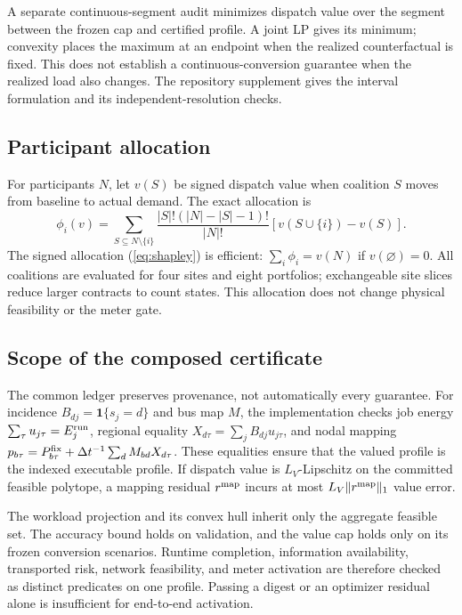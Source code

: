 \documentclass[10pt,journal]{IEEEtran}
\newcommand{\dt}{\Delta t}
\begin{document}
A separate continuous-segment audit minimizes dispatch value over the segment
between the frozen cap and certified profile. A joint LP gives its minimum;
convexity places the maximum at an endpoint when the realized counterfactual
is fixed. This does not establish a continuous-conversion guarantee when the
realized load also changes. The repository supplement gives the interval
formulation and its independent-resolution checks.

\subsection{Participant allocation}

For participants $N$, let $v(S)$ be signed dispatch value when coalition $S$
moves from baseline to actual demand. The exact allocation is
\begin{equation}
 \phi_i(v)=\sum_{S\subseteq N\setminus\{i\}}
 \frac{|S|!(|N|-|S|-1)!}{|N|!}
 [v(S\cup\{i\})-v(S)].
 \label{eq:shapley}
\end{equation}
The signed allocation (\ref{eq:shapley}) \cite{shapley1953value} is efficient:
$\sum_i\phi_i=v(N)$ if $v(\varnothing)=0$. All coalitions are evaluated for
four sites and eight portfolios; exchangeable site slices reduce larger
contracts to count states. This allocation does not change physical
feasibility or the meter gate.

\subsection{Scope of the composed certificate}

The common ledger preserves provenance, not automatically every guarantee.
For incidence $B_{dj}=\mathbf1\{s_j=d\}$ and bus map $M$, the implementation
checks job energy $\sum_\tau u_{j\tau}=E_j^{\rm run}$, regional equality
$X_{d\tau}=\sum_jB_{dj}u_{j\tau}$, and nodal mapping
$p_{b\tau}=P^{\rm fix}_{b\tau}+\dt^{-1}\sum_dM_{bd}X_{d\tau}$.
These equalities ensure that the valued profile is the indexed executable
profile. If dispatch value is $L_V$-Lipschitz on the committed feasible
polytope, a mapping residual $r^{\rm map}$ incurs at most
$L_V\|r^{\rm map}\|_1$ value error.

The workload projection and its convex hull inherit only the aggregate
feasible set. The accuracy bound holds on validation, and the value cap holds
only on its frozen conversion scenarios. Runtime completion, information
availability, transported risk, network feasibility, and meter activation are
therefore checked as distinct predicates on one profile. Passing a digest or
an optimizer residual alone is insufficient for end-to-end activation.
\end{document}
